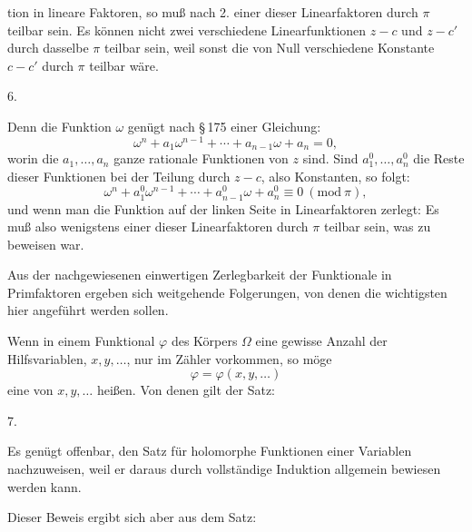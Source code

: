 tion in lineare Faktoren, so muß nach 2. einer dieser Linearfaktoren durch $\pi$ teilbar sein. Es können nicht zwei verschiedene Linearfunktionen $z - c$ und $z - c'$ durch dasselbe $\pi$ teilbar sein, weil sonst die von Null verschiedene Konstante $c - c'$ durch $\pi$ teilbar wäre.

6. 

Denn die Funktion $\omega$ genügt nach \S\,175 einer Gleichung:
\[
\omega^n + a_1 \omega^{n-1} + \cdots + a_{n-1}\omega + a_n = 0,
\]
worin die $a_1, \ldots, a_n$ ganze rationale Funktionen von $z$ sind. Sind $a_1^0, \ldots, a_n^0$ die Reste dieser Funktionen bei der Teilung durch $z - c$, also Konstanten, so folgt:
\[
\omega^n + a_1^0 \omega^{n-1} + \cdots + a_{n-1}^0 \omega + a_n^0 \equiv 0\ (\mathrm{mod}\ \pi),
\]
und wenn man die Funktion auf der linken Seite in Linearfaktoren zerlegt:
Es muß also wenigstens einer dieser Linearfaktoren durch $\pi$ teilbar sein, was zu beweisen war.

Aus der nachgewiesenen einwertigen Zerlegbarkeit der Funktionale in Primfaktoren ergeben sich weitgehende Folgerungen, von denen die wichtigsten hier angeführt werden sollen.

Wenn in einem Funktional $\varphi$ des Körpers $\Omega$ eine gewisse Anzahl der Hilfsvariablen, $x, y, \ldots$, nur im Zähler vorkommen, so möge
\[
\varphi = \varphi(x, y, \ldots)
\]
eine  von $x, y, \ldots$ heißen. Von denen gilt der Satz:

7. 

Es genügt offenbar, den Satz für holomorphe Funktionen einer Variablen
nachzuweisen, weil er daraus durch vollständige Induktion allgemein bewiesen werden kann.

Dieser Beweis ergibt sich aber aus dem  Satz:
